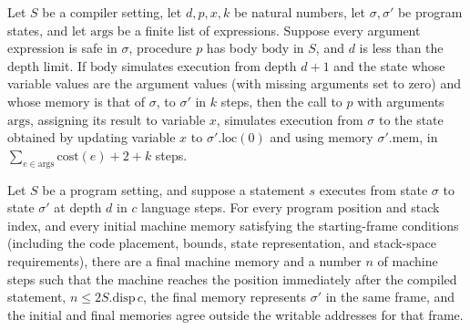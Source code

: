 \begin{theorem}
\label{Light.Compiler.sim_call}
\leanok
{}
Let $S$ be a compiler setting, let $d,p,x,k$ be natural numbers, let
$\sigma,\sigma'$ be program states, and let $\mathrm{args}$ be a finite list
of expressions. Suppose every argument expression is safe in $\sigma$, procedure $p$
has body $\mathrm{body}$ in $S$, and $d$ is less than the depth limit. If
$\mathrm{body}$ simulates execution from depth $d+1$ and the state whose variable
values are the argument values (with missing arguments set to zero) and whose memory is
that of $\sigma$, to $\sigma'$ in $k$ steps, then the call to $p$ with arguments
$\mathrm{args}$, assigning its result to variable $x$, simulates execution from
$\sigma$ to the state obtained by updating variable $x$ to
$\sigma'.\mathrm{loc}(0)$ and using memory $\sigma'.\mathrm{mem}$, in
$\sum_{e\in\mathrm{args}}\mathrm{cost}(e)+2+k$ steps.
\end{theorem}

\begin{theorem}
\label{Light.Compiler.sim}
\leanok
{}
Let $S$ be a program setting, and suppose a statement $s$ executes from state $\sigma$
to state $\sigma'$ at depth $d$ in $c$ language steps. For every program position and
stack index, and every initial machine memory satisfying the starting-frame conditions
(including the code placement, bounds, state representation, and stack-space
requirements), there are a final machine memory and a number $n$ of machine steps such
that the machine reaches the position immediately after the compiled statement, $n \le
2S.\mathrm{disp}\,c$, the final memory represents $\sigma'$ in the same frame, and the
initial and final memories agree outside the writable addresses for that frame.
\end{theorem}
